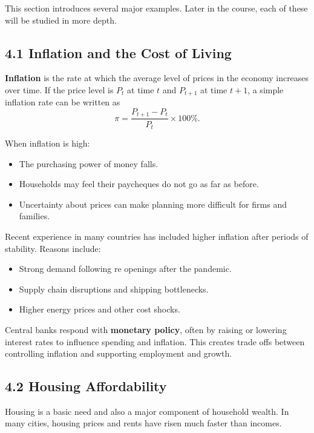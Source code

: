 \documentclass[12pt]{article}
\begin{document}
This section introduces several major examples. Later in the course, each of these will be studied in more depth.

\subsection*{4.1 Inflation and the Cost of Living}

\textbf{Inflation} is the rate at which the average level of prices in the economy increases over time. If the price level is \(P_t\) at time \(t\) and \(P_{t+1}\) at time \(t+1\), a simple inflation rate can be written as
\[
\pi = \frac{P_{t+1} - P_t}{P_t} \times 100\%.
\]

When inflation is high:

\begin{itemize}[noitemsep]
    \item The purchasing power of money falls.
    \item Households may feel their paycheques do not go as far as before.
    \item Uncertainty about prices can make planning more difficult for firms and families.
\end{itemize}

Recent experience in many countries has included higher inflation after periods of stability. Reasons include:

\begin{itemize}[noitemsep]
    \item Strong demand following re openings after the pandemic.
    \item Supply chain disruptions and shipping bottlenecks.
    \item Higher energy prices and other cost shocks.
\end{itemize}

Central banks respond with \textbf{monetary policy}, often by raising or lowering interest rates to influence spending and inflation. This creates trade offs between controlling inflation and supporting employment and growth.

\newpage
\subsection*{4.2 Housing Affordability}

Housing is a basic need and also a major component of household wealth. In many cities, housing prices and rents have risen much faster than incomes.
\end{document}
